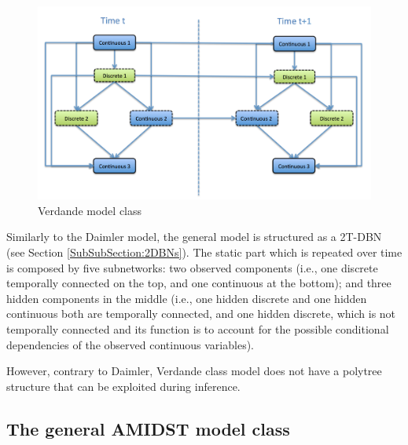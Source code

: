 \begin{figure}[ht!]
\begin{center}
\includegraphics[scale=0.4]{./figures/VerdandeModelClass}
\caption{\label{Figure:VerdandeModelClass} Verdande model class}
\end{center}
\end{figure}

Similarly to the Daimler model, the general model is structured as a 2T-DBN (see Section \ref{SubSubSection:2DBNs}). The static part which is repeated over time is composed by five subnetworks: two observed components (i.e., one discrete temporally connected on the top, and one continuous at the bottom); and three hidden components in the middle (i.e., one hidden discrete and one hidden continuous both are temporally connected, and one hidden discrete, which is not temporally connected and its function is to account for the possible conditional dependencies of the observed continuous variables).  

However, contrary to Daimler, Verdande class model does not have a polytree structure that can be exploited during inference. 

\subsection{The general AMIDST model class}

